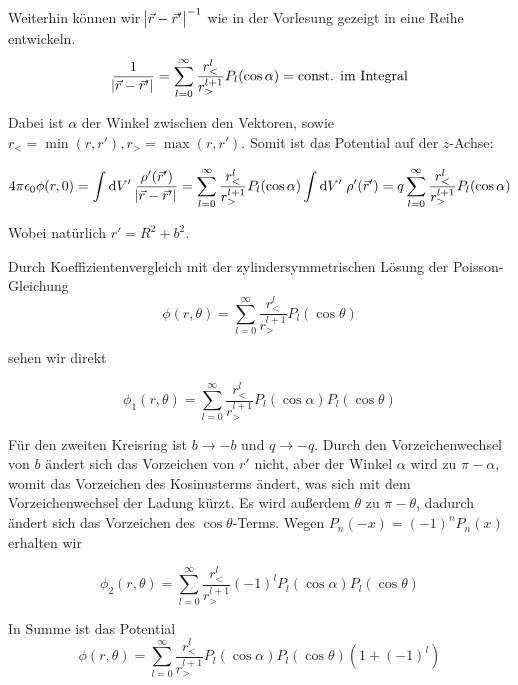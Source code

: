 \documentclass[a4paper,german,12pt,smallheadings]{scrartcl}
\begin{document}
Weiterhin können wir $\envert{\vec{r} - \vec{r}'}^{-1}$ wie in der Vorlesung
gezeigt in eine Reihe entwickeln.
\begin{equation}
  \frac{1}{\envert{\vec{r} - \vec{r}'}}
  = \sum_{l=0}^\infty \frac{r_<^l}{r_>^{l+1}} P_l(\cos \alpha)
  = \text{const. im Integral}
\end{equation}

Dabei ist $\alpha$ der Winkel zwischen den Vektoren, sowie $r_< = \min(r,r'),
r_> = \max(r,r')$. Somit ist das Potential auf der $z$-Achse:

\begin{equation}
  4 \pi \epsilon_0 \phi(r,0)
  = \int \dif V' \; \frac{\rho'(\vec{r}')}{\envert{\vec{r} - \vec{r}'}}
  = \sum_{l=0}^\infty \frac{r_<^l}{r_>^{l+1}} P_l(\cos \alpha) \int \dif V' \; \rho'(\vec{r}')
  = q \sum_{l=0}^\infty \frac{r_<^l}{r_>^{l+1}} P_l(\cos \alpha)
\end{equation}

Wobei natürlich $r' = R^2 + b^2$.

Durch Koeffizientenvergleich mit der zylindersymmetrischen Lösung der
Poisson-Gleichung
\begin{equation}
  \phi(r,\theta) = \sum_{l=0}^\infty \frac{r_<^l}{r_>^{l+1}} P_l(\cos \theta)
\end{equation}

sehen wir direkt

\begin{equation}
  \phi_1(r,\theta) = \sum_{l=0}^\infty \frac{r_<^l}{r_>^{l+1}} P_l(\cos \alpha) P_l(\cos \theta)
\end{equation}

Für den zweiten Kreisring ist $b \to -b$ und $q \to -q$. Durch den
Vorzeichenwechsel von $b$ ändert sich das Vorzeichen von $r'$ nicht, aber der
Winkel $\alpha$ wird zu $\pi - \alpha$, womit das Vorzeichen des Kosinusterms
ändert, was sich mit dem Vorzeichenwechsel der Ladung kürzt. Es wird außerdem
$\theta$ zu $\pi - \theta$, dadurch ändert sich das Vorzeichen des $\cos
\theta$-Terms. Wegen $P_n(-x) = (-1)^n P_n(x)$ erhalten wir

\begin{equation}
  \phi_2(r,\theta) = \sum_{l=0}^\infty \frac{r_<^l}{r_>^{l+1}} (-1)^l P_l(\cos \alpha) P_l(\cos \theta)
\end{equation}

In Summe ist das Potential
\begin{equation}
  \phi(r, \theta) = \sum_{l=0}^\infty \frac{r_<^l}{r_>^{l+1}} P_l(\cos \alpha) P_l(\cos \theta) (1+(-1)^l)
\end{equation}
\end{document}

